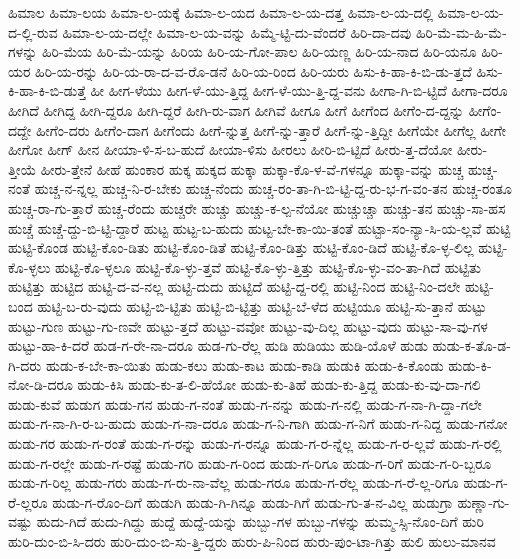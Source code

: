 {ಹಿಮಾಲ
ಹಿಮಾ-ಲಯ
ಹಿಮಾ-ಲ-ಯಕ್ಕೆ
ಹಿಮಾ-ಲ-ಯದ
ಹಿಮಾ-ಲ-ಯ-ದತ್ತ
ಹಿಮಾ-ಲ-ಯ-ದಲ್ಲಿ
ಹಿಮಾ-ಲ-ಯ-ದ-ಲ್ಲಿ-ರುವ
ಹಿಮಾ-ಲ-ಯ-ದಲ್ಲೇ
ಹಿಮಾ-ಲ-ಯ-ವನ್ನು
ಹಿಮ್ಮೆ-ಟ್ಟಿ-ದು-ವೆಂದರೆ
ಹಿರಿ-ದಾ-ದವು
ಹಿರಿ-ಮೆ-ಮ-ಹಿ-ಮೆ-ಗಳನ್ನು
ಹಿರಿ-ಮೆಯ
ಹಿರಿ-ಮೆ-ಯನ್ನು
ಹಿರಿಯ
ಹಿರಿ-ಯ-ಗೋ-ಪಾಲ
ಹಿರಿ-ಯಣ್ಣ
ಹಿರಿ-ಯ-ನಾದ
ಹಿರಿ-ಯನೂ
ಹಿರಿ-ಯರ
ಹಿರಿ-ಯ-ರನ್ನು
ಹಿರಿ-ಯ-ರಾ-ದ-ವ-ರೊ-ಡನೆ
ಹಿರಿ-ಯ-ರಿಂದ
ಹಿರಿ-ಯರು
ಹಿಸು-ಕಿ-ಹಾ-ಕಿ-ಬಿ-ಡು-ತ್ತದೆ
ಹಿಸು-ಕಿ-ಹಾ-ಕಿ-ಬಿ-ಡುತ್ತೆ
ಹೀ
ಹೀಗ-ಳೆಯು
ಹೀಗ-ಳೆ-ಯು-ತ್ತಿದ್ದ
ಹೀಗ-ಳೆ-ಯು-ತ್ತಿ-ದ್ದ-ವನು
ಹೀಗಾ-ಗಿ-ಬಿ-ಟ್ಟಿದೆ
ಹೀಗಾ-ದರೂ
ಹೀಗಿದೆ
ಹೀಗಿದ್ದ
ಹೀಗಿ-ದ್ದರೂ
ಹೀಗಿ-ದ್ದರೆ
ಹೀಗಿ-ರು-ವಾಗ
ಹೀಗಿವೆ
ಹೀಗೂ
ಹೀಗೆ
ಹೀಗೆಂದ
ಹೀಗೆಂ-ದ-ದ್ದನ್ನು
ಹೀಗೆಂ-ದದ್ದೇ
ಹೀಗೆಂ-ದರು
ಹೀಗೆಂ-ದಾಗ
ಹೀಗೆಂದು
ಹೀಗೆ-ನ್ನುತ್ತ
ಹೀಗೆ-ನ್ನು-ತ್ತಾರೆ
ಹೀಗೆ-ನ್ನು-ತ್ತಿದ್ದೀ
ಹೀಗೆಯೇ
ಹೀಗೆಲ್ಲ
ಹೀಗೇ
ಹೀಗೋ
ಹೀಗ್
ಹೀನ
ಹೀಯಾ-ಳಿ-ಸ-ಬ-ಹುದೆ
ಹೀಯಾ-ಳಿಸು
ಹೀರಲು
ಹೀರಿ-ಬಿ-ಟ್ಟಿದೆ
ಹೀರು-ತ್ತ-ದೆಯೋ
ಹೀರು-ತ್ತೀಯೆ
ಹೀರು-ತ್ತೇನೆ
ಹೀಹೆ
ಹುಂಕಾರ
ಹುಕ್ಕ
ಹುಕ್ಕದ
ಹುಕ್ಕಾ
ಹುಕ್ಕಾ-ಕೊ-ಳ-ವೆ-ಗಳನ್ನೂ
ಹುಕ್ಕಾ-ವನ್ನು
ಹುಚ್ಚ
ಹುಚ್ಚ-ನಂತೆ
ಹುಚ್ಚ-ನ-ನ್ನಲ್ಲ
ಹುಚ್ಚ-ನಿ-ರ-ಬೇಕು
ಹುಚ್ಚ-ನೆಂದು
ಹುಚ್ಚ-ರಂ-ತಾ-ಗಿ-ಬಿ-ಟ್ಟಿ-ದ್ದ-ರು-ಭ-ಗ-ವಂ-ತನ
ಹುಚ್ಚ-ರಂತೂ
ಹುಚ್ಚ-ರಾ-ಗು-ತ್ತಾರೆ
ಹುಚ್ಚ-ರೆಂದು
ಹುಚ್ಚರೇ
ಹುಚ್ಚು
ಹುಚ್ಚು-ಕ-ಲ್ಪ-ನೆಯೋ
ಹುಚ್ಚುಚ್ಚಾ
ಹುಚ್ಚು-ತನ
ಹುಚ್ಚು-ಸಾ-ಹಸ
ಹುಚ್ಚೆ
ಹುಚ್ಚೆ-ದ್ದು-ಬಿ-ಟ್ಟಿ-ದ್ದಾರೆ
ಹುಟ್ಟ
ಹುಟ್ಟ-ಬ-ಹುದು
ಹುಟ್ಟ-ಬೇ-ಕಾ-ಯಿ-ತಂತೆ
ಹುಟ್ಟಾ-ಸಂ-ನ್ಯಾ-ಸಿ-ಯ-ಲ್ಲವೆ
ಹುಟ್ಟಿ
ಹುಟ್ಟಿ-ಕೊಂಡ
ಹುಟ್ಟಿ-ಕೊಂ-ಡಿತು
ಹುಟ್ಟಿ-ಕೊಂ-ಡಿತೆ
ಹುಟ್ಟಿ-ಕೊಂ-ಡಿತ್ತು
ಹುಟ್ಟಿ-ಕೊಂ-ಡಿದೆ
ಹುಟ್ಟಿ-ಕೊ-ಳ್ಳ-ಲಿಲ್ಲ
ಹುಟ್ಟಿ-ಕೊ-ಳ್ಳಲು
ಹುಟ್ಟಿ-ಕೊ-ಳ್ಳಲೂ
ಹುಟ್ಟಿ-ಕೊ-ಳ್ಳು-ತ್ತವೆ
ಹುಟ್ಟಿ-ಕೊ-ಳ್ಳು-ತ್ತಿತ್ತು
ಹುಟ್ಟಿ-ಕೊ-ಳ್ಳು-ವಂ-ತಾ-ಗಿದೆ
ಹುಟ್ಟಿತು
ಹುಟ್ಟಿತ್ತು
ಹುಟ್ಟಿದ
ಹುಟ್ಟಿ-ದ-ವ-ನಲ್ಲ
ಹುಟ್ಟಿ-ದುದು
ಹುಟ್ಟಿದೆ
ಹುಟ್ಟಿ-ದ್ದ-ರಲ್ಲಿ
ಹುಟ್ಟಿ-ನಿಂದ
ಹುಟ್ಟಿ-ನಿಂ-ದಲೇ
ಹುಟ್ಟಿ-ಬಂದ
ಹುಟ್ಟಿ-ಬ-ರು-ವುದು
ಹುಟ್ಟಿ-ಬಿ-ಟ್ಟಿತು
ಹುಟ್ಟಿ-ಬಿ-ಟ್ಟಿತ್ತು
ಹುಟ್ಟಿ-ಬೆ-ಳೆದ
ಹುಟ್ಟಿಯೂ
ಹುಟ್ಟಿ-ಸು-ತ್ತಾನೆ
ಹುಟ್ಟು
ಹುಟ್ಟು-ಗುಣ
ಹುಟ್ಟು-ಗು-ಣವೇ
ಹುಟ್ಟು-ತ್ತದೆ
ಹುಟ್ಟು-ವವೋ
ಹುಟ್ಟು-ವು-ದಿಲ್ಲ
ಹುಟ್ಟು-ವುದು
ಹುಟ್ಟು-ಸಾ-ವು-ಗಳ
ಹುಟ್ಟು-ಹಾ-ಕಿ-ದರೆ
ಹುಡ-ಗ-ರೇ-ನಾ-ದರೂ
ಹುಡ-ಗು-ರೆಲ್ಲ
ಹುಡಿ
ಹುಡಿಯು
ಹುಡಿ-ಯೊಳೆ
ಹುಡು
ಹುಡು-ಕ-ತೊ-ಡ-ಗಿ-ದರು
ಹುಡು-ಕ-ಬೇ-ಕಾ-ಯಿತು
ಹುಡು-ಕಲು
ಹುಡು-ಕಾಟ
ಹುಡು-ಕಾಡಿ
ಹುಡುಕಿ
ಹುಡು-ಕಿ-ಕೊಂಡು
ಹುಡು-ಕಿ-ನೋ-ಡಿ-ದರೂ
ಹುಡು-ಕಿಸಿ
ಹುಡು-ಕು-ತ-ಲಿ-ಹೆಯೋ
ಹುಡು-ಕು-ತಿಹೆ
ಹುಡು-ಕು-ತ್ತಿದ್ದ
ಹುಡು-ಕು-ವು-ದಾ-ಗಲಿ
ಹುಡು-ಕುವೆ
ಹುಡುಗ
ಹುಡು-ಗನ
ಹುಡು-ಗ-ನಂತೆ
ಹುಡು-ಗ-ನನ್ನು
ಹುಡು-ಗ-ನಲ್ಲಿ
ಹುಡು-ಗ-ನಾ-ಗಿ-ದ್ದಾ-ಗಲೇ
ಹುಡು-ಗ-ನಾ-ಗಿ-ರ-ಬ-ಹುದು
ಹುಡು-ಗ-ನಾ-ದರೂ
ಹುಡು-ಗ-ನಿ-ಗಾಗಿ
ಹುಡು-ಗ-ನಿಗೆ
ಹುಡು-ಗ-ನಿದ್ದ
ಹುಡು-ಗನೋ
ಹುಡು-ಗರ
ಹುಡು-ಗ-ರಂತೆ
ಹುಡು-ಗ-ರನ್ನು
ಹುಡು-ಗ-ರನ್ನೂ
ಹುಡು-ಗ-ರ-ನ್ನೆಲ್ಲ
ಹುಡು-ಗ-ರ-ಲ್ಲವೆ
ಹುಡು-ಗ-ರಲ್ಲಿ
ಹುಡು-ಗ-ರಲ್ಲೇ
ಹುಡು-ಗ-ರಷ್ಟೆ
ಹುಡು-ಗರಿ
ಹುಡು-ಗ-ರಿಂದ
ಹುಡು-ಗ-ರಿಗೂ
ಹುಡು-ಗ-ರಿಗೆ
ಹುಡು-ಗ-ರಿ-ಬ್ಬರೂ
ಹುಡು-ಗ-ರಿಲ್ಲ
ಹುಡು-ಗರು
ಹುಡು-ಗ-ರು-ನಾ-ವೆಲ್ಲ
ಹುಡು-ಗರೂ
ಹುಡು-ಗ-ರೆಲ್ಲ
ಹುಡು-ಗ-ರೆ-ಲ್ಲ-ರಿಗೂ
ಹುಡು-ಗ-ರೆ-ಲ್ಲರೂ
ಹುಡು-ಗ-ರೊಂ-ದಿಗೆ
ಹುಡುಗಿ
ಹುಡು-ಗಿ-ಗಿನ್ನೂ
ಹುಡು-ಗಿಗೆ
ಹುಡು-ಗು-ತ-ನ-ವಿಲ್ಲ
ಹುಡುಗ್ರಾ
ಹುಣ್ಣಾ-ಗು-ವಷ್ಟು
ಹುದು-ಗಿದೆ
ಹುದು-ಗಿದ್ದು
ಹುದ್ದೆ
ಹುದ್ದೆ-ಯನ್ನು
ಹುಬ್ಬು-ಗಳ
ಹುಬ್ಬು-ಗಳನ್ನು
ಹುಮ್ಮ-ಸ್ಸಿ-ನೊಂ-ದಿಗೆ
ಹುರಿ
ಹುರಿ-ದುಂ-ಬಿ-ಸಿ-ದರು
ಹುರಿ-ದುಂ-ಬಿ-ಸು-ತ್ತಿ-ದ್ದರು
ಹುರು-ಪಿ-ನಿಂದ
ಹುರು-ಪುಂ-ಟಾ-ಗಿತ್ತು
ಹುಲಿ
ಹುಲು-ಮಾನವ
}
